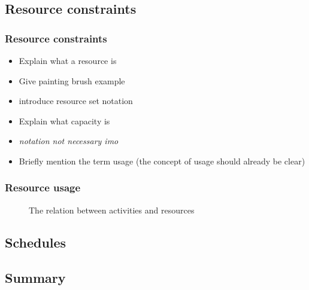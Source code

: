 \documentclass{beamer}
\theoremstyle{definition}
\newcommand{\inputtikz}[1]{}
\newcommand{\mick}[1]{{\color{red}\emph{#1}}}
\begin{document}
\subsection{Resource constraints}
\begin{frame}
	\frametitle{Resource constraints}
	\begin{itemize}
		\item Explain what a resource is
		\item Give painting brush example
		\item introduce resource set notation
		\item Explain what capacity is
		\item \mick{notation not necessary imo}
		\item Briefly mention the term usage (the concept of usage should already be clear)
	\end{itemize}
\end{frame}
	
\begin{frame}
	\frametitle{Resource usage}
	\vspace{-1em}
	\begin{figure}[ht]
		\makebox[\textwidth][c]{\resizebox{.8\paperwidth}{!}{
			\inputtikz{usage}
		}}
		\vspace{-1em}
		\caption{The relation between activities and resources}
		\label{fig:activity_graph}
	\end{figure}
\end{frame}

\subsection{Schedules}


\subsection{Summary}
\end{document}
